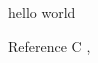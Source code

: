 \documentclass[prl]{revtex4-1}
\begin{document}
hello world

Reference C \cite{Verstraete:2004d},



\end{document}

